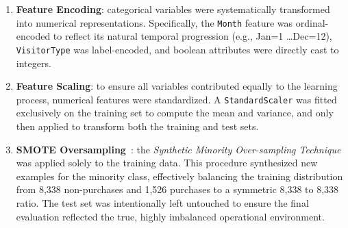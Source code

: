 \begin{enumerate}
    \item \textbf{Feature Encoding}: categorical variables were systematically transformed into numerical representations. Specifically, the \texttt{Month} feature was ordinal-encoded to reflect its natural temporal progression (e.g., Jan=1 \dots Dec=12), \texttt{VisitorType} was label-encoded, and boolean attributes were directly cast to integers.
    \item \textbf{Feature Scaling}: to ensure all variables contributed equally to the learning process, numerical features were standardized. A \texttt{StandardScaler} was fitted exclusively on the training set to compute the mean and variance, and only then applied to transform both the training and test sets.
    \item \textbf{SMOTE Oversampling}~\cite{chawla2002}: the \textit{Synthetic Minority Over-sampling Technique} was applied solely to the training data. This procedure synthesized new examples for the minority class, effectively balancing the training distribution from 8,338 non-purchases and 1,526 purchases to a symmetric 8,338 to 8,338 ratio. The test set was intentionally left untouched to ensure the final evaluation reflected the true, highly imbalanced operational environment.
\end{enumerate}